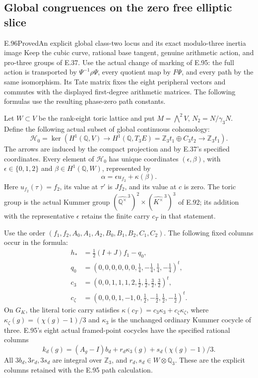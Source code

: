 \subsection{Global congruences on the zero free elliptic slice}

\begin{statement}{E.96}{Proved}{An explicit global class-two locus and its exact modulo-three inertia image}
Keep the cubic curve, rational base tangent, genuine arithmetic action,
and pro-three groups of E.37. Use the actual change of marking of E.95:
the full action is transported by $\Psi^{-1}\rho\Psi$, every quotient
map by $F\Psi$, and every path by the same isomorphism. Its Tate matrix
fixes the eight peripheral vectors and commutes with the displayed
first-degree arithmetic matrices. The following formulas use the
resulting phase-zero path constants.

Let $W\subset V$ be the rank-eight toric lattice and put
$M=\bigwedge^2V$, $N_2=N/\gamma_3N$. Define the following actual
subset of global continuous cohomology:
\[
 \mathcal H_0=\ker\left(
 H^1(\mathbb Q,V)\longrightarrow H^1(\mathbb Q,T_3E)
       =\mathbb Z_3t_1\oplus C_3t_2
       \longrightarrow\mathbb Z_3t_1\right).
 \tag{E96.1}
\]
The arrows are induced by the compact projection and by E.37's
specified coordinates. Every element of $\mathcal H_0$ has unique
coordinates $(\epsilon,\beta)$, with $\epsilon\in\{0,1,2\}$ and
$\beta\in H^1(\mathbb Q,W)$, represented by
\[
 \alpha=\epsilon u_{f_2}+\kappa(\beta).
 \tag{E96.2}
\]
Here $u_{f_2}(\tau)=f_2$, its value at $\tau'$ is $Jf_2$,
and its value at $c$ is zero. The toric group is the actual Kummer
group
$(\widehat{\mathbb Q^\times}^{\,3})^2
 \times(\widehat{K^\times}^{\,3})^3$ of E.92;
its addition with the representative $\epsilon$ retains the
finite carry $c_T$ in that statement.

Use the order $(f_1,f_2,A_0,A_1,A_2,B_0,B_1,B_2,C_1,C_2)$.
The following fixed columns occur in the formula:
\[
 \begin{aligned}
 h_*&=\tfrac12(I+J)f_1-q_0,\\
 q_0&=(0,0,0,0,0,0,\tfrac14,-\tfrac14,\tfrac14,-\tfrac14)^t,\\
 c_3&=(0,0,1,1,1,2,\tfrac12,\tfrac12,\tfrac32,\tfrac32)^t,\\
 c_\zeta&=(0,0,0,1,-1,0,\tfrac12,-\tfrac12,
                                  \tfrac12,-\tfrac12)^t.
 \end{aligned}
 \tag{E96.3}
\]
On $G_K$, the literal toric carry satisfies
$\kappa(c_T)=c_3\kappa_3+c_\zeta\kappa_\zeta$, where
$\kappa_\zeta(g)=(\chi(g)-1)/3$ and $\kappa_3$ is the
unchanged ordinary Kummer cocycle of three. E.95's eight actual
framed-point cocycles have the specified rational columns
\[
 k_d(g)=(A_g-I)b_d+r_d\kappa_3(g)
                          +s_d(\chi(g)-1)/3.
 \tag{E96.4}
\]
All $3b_d,3r_d,3s_d$ are integral over $\mathbb Z_3$,
and $r_d,s_d\in W\otimes\mathbb Q_3$. These are the
explicit columns retained with the E.95 path calculation.


\end{statement}
